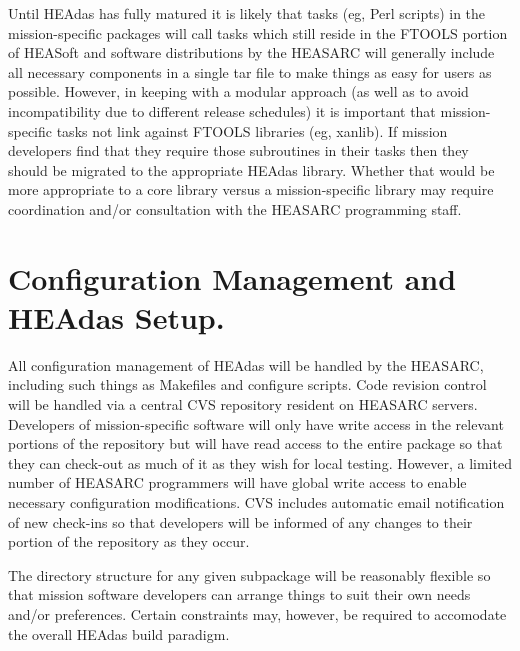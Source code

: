 \documentclass[11pt]{book}
\begin{document}
Until HEAdas has fully matured it is likely that tasks (eg, Perl
scripts) in the mission-specific packages will call tasks which still
reside in the FTOOLS portion of HEASoft and software
distributions by the HEASARC will generally include all
necessary components in a single tar file to make things as easy
for users as possible. However, in keeping with a modular
approach (as well as to avoid incompatibility due to different
release schedules) it is important that mission-specific tasks not
link against FTOOLS libraries (eg, xanlib). If mission developers
find that they require those subroutines in their tasks then they
should be migrated to the appropriate HEAdas library. Whether
that would be more appropriate to a core library versus a
mission-specific library may require coordination and/or
consultation with the HEASARC programming staff.

\section{Configuration Management and HEAdas Setup.}

All configuration management of HEAdas will be handled by the
HEASARC, including such things as Makefiles and configure
scripts. Code revision control will be handled via a central CVS
repository resident on HEASARC servers. Developers of
mission-specific software will only have write access in the
relevant portions of the repository but will have read access to the
entire package so that they can check-out as much of it as they
wish for local testing. However, a limited number of HEASARC
programmers will have global write access to enable necessary
configuration modifications. CVS includes automatic email
notification of new check-ins so that developers will be informed
of any changes to their portion of the repository as they occur.

The directory structure for any given subpackage will be
reasonably flexible so that mission software developers can
arrange things to suit their own needs and/or preferences. Certain
constraints may, however, be required to accomodate the overall
HEAdas build paradigm.
\end{document}
